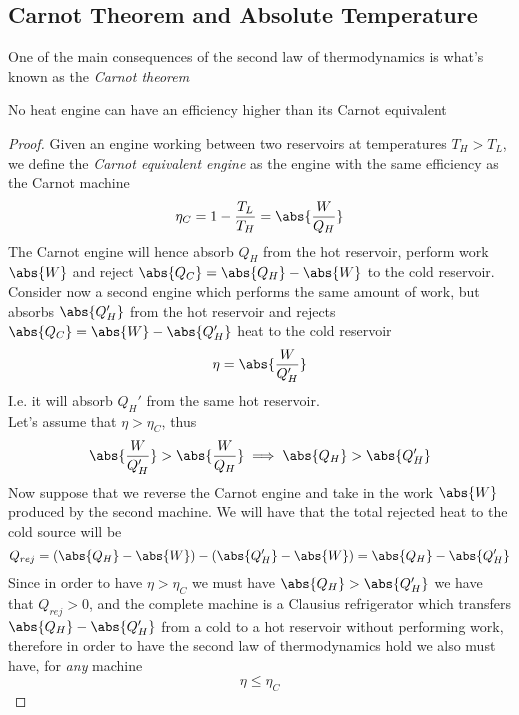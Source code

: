 \documentclass[../qm.tex]{subfiles}
\begin{document}
\subsection{Carnot Theorem and Absolute Temperature}
One of the main consequences of the second law of thermodynamics is what's known as the \emph{Carnot theorem}
\begin{thm}[Carnot]
	No heat engine can have an efficiency higher than its Carnot equivalent
\end{thm}
\begin{proof}
	Given an engine working between two reservoirs at temperatures $T_H>T_L$, we define the \textit{Carnot equivalent engine} as the engine with the same efficiency as the Carnot machine
	\begin{equation*}
		\eta_C=1-\frac{T_L}{T_H}=\abs{\frac{W}{Q_H}}
	\end{equation*}
	The Carnot engine will hence absorb $Q_H$ from the hot reservoir, perform work $\abs{W}$ and reject $\abs{Q_{C}}=\abs{Q_H}-\abs{W}$ to the cold reservoir.\\
	Consider now a second engine which performs the same amount of work, but absorbs $\abs{Q_H'}$ from the hot reservoir and rejects $\abs{Q_C}=\abs{W}-\abs{Q_H'}$ heat to the cold reservoir
	\begin{equation*}
		\eta=\abs{\frac{W}{Q_H'}}
	\end{equation*}
	I.e. it will absorb $Q_H'$ from the same hot reservoir.\\
	Let's assume that $\eta>\eta_C$, thus 
	\begin{equation*}
		\abs{\frac{W}{Q_H'}}>\abs{\frac{W}{Q_H}}\implies{}\abs{Q_H}>\abs{Q_H'}
	\end{equation*}
	Now suppose that we reverse the Carnot engine and take in the work $\abs{W}$ produced by the second machine. We will have that the total rejected heat to the cold source will be
	\begin{equation*}
		Q_{rej}=\left( \abs{Q_H}-\abs{W} \right)-\left( \abs{Q_H'}-\abs{W} \right)=\abs{Q_H}-\abs{Q_H'}
	\end{equation*}
	Since in order to have $\eta>\eta_C$ we must have $\abs{Q_H}>\abs{Q_H'}$ we have that $Q_{rej}>0$, and the complete machine is a Clausius refrigerator which transfers $\abs{Q_H}-\abs{Q_H'}$ from a cold to a hot reservoir without performing work, therefore in order to have the second law of thermodynamics hold we also must have, for \textit{any} machine
	\begin{equation}
		\eta\le\eta_C
		\label{eq:carnottheorem.2nd}
	\end{equation}
\end{proof}
\end{document}
